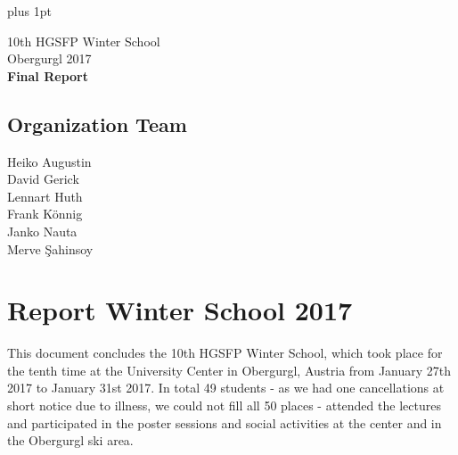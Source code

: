 \documentclass[11pt,a4paper]{article}
\numberwithin{equation}{section}
\numberwithin{table}{section}\setlength{\multlinegap}{25pt}
\begin{document}
\baselineskip=14pt
\parskip 5pt plus 1pt 


\vspace*{-1.5cm}
\begin{flushright}    %
  {\small

  }
\end{flushright}

\vspace{2cm}
\begin{center}        %
  {\LARGE 10th HGSFP Winter School}\\
   {\Large Obergurgl 2017}\\
   \vspace{2cm}
   {\LARGE \bf Final Report}
\end{center}
\pagestyle{empty}
\vspace{12cm}
%
\subsection*{Organization Team}
	Heiko Augustin \\
	David Gerick \\
	Lennart Huth \\
	Frank K\"onnig \\
	Janko Nauta \\
	Merve \c{S}ahinsoy \\


\newpage
\setcounter{page}{1}

\pagestyle{plain}

\section{Report Winter School 2017}

This document concludes the 10th HGSFP Winter School, which took place for the tenth time at the University Center in Obergurgl, Austria from January 27th 2017 to January 31st 2017. In total 49 students - as we had one cancellations at short notice due to illness, we could not fill all 50 places - attended the lectures and participated in the poster sessions and social activities at the center and in the Obergurgl ski area. 
\end{document}
